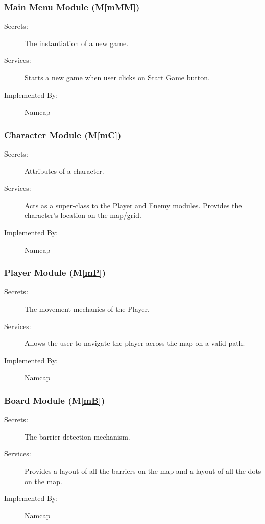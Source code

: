 \documentclass[12pt, titlepage]{article}
\newcommand{\mref}[1]{M\ref{#1}}
\begin{document}
\subsubsection{Main Menu Module (\mref{mMM})}

\begin{description}
\item[Secrets:]The instantiation of a new game.
\item[Services:]Starts a new game when user clicks on Start Game button.
\item[Implemented By:] Namcap
\end{description}

\subsubsection{Character Module (\mref{mC})}

\begin{description}
\item[Secrets:]Attributes of a character.
\item[Services:]Acts as a super-class to the Player and Enemy modules. Provides the character's location on the map/grid.
\item[Implemented By:] Namcap
\end{description}

\subsubsection{Player Module (\mref{mP})}

\begin{description}
\item[Secrets:]The movement mechanics of the Player.
\item[Services:]Allows the user to navigate the player across the map on a valid path.
\item[Implemented By:] Namcap
\end{description}

\subsubsection{Board Module (\mref{mB})}

\begin{description}
\item[Secrets:]The barrier detection mechanism.
\item[Services:]Provides a layout of all the barriers on the map and a layout of all the dots on the map.
\item[Implemented By:] Namcap
\end{description}
\end{document}
